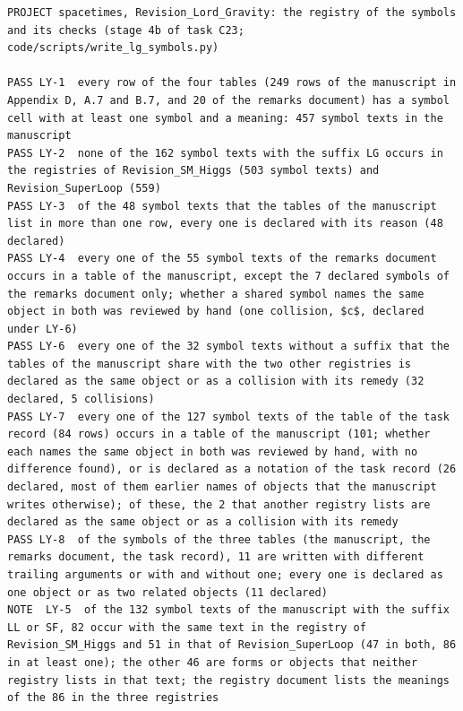 \documentclass[
  10pt,
]{article}
\begin{document}
\begin{verbatim}
PROJECT spacetimes, Revision_Lord_Gravity: the registry of the symbols and its checks (stage 4b of task C23; code/scripts/write_lg_symbols.py)

PASS LY-1  every row of the four tables (249 rows of the manuscript in Appendix D, A.7 and B.7, and 20 of the remarks document) has a symbol cell with at least one symbol and a meaning: 457 symbol texts in the manuscript
PASS LY-2  none of the 162 symbol texts with the suffix LG occurs in the registries of Revision_SM_Higgs (503 symbol texts) and Revision_SuperLoop (559)
PASS LY-3  of the 48 symbol texts that the tables of the manuscript list in more than one row, every one is declared with its reason (48 declared)
PASS LY-4  every one of the 55 symbol texts of the remarks document occurs in a table of the manuscript, except the 7 declared symbols of the remarks document only; whether a shared symbol names the same object in both was reviewed by hand (one collision, $c$, declared under LY-6)
PASS LY-6  every one of the 32 symbol texts without a suffix that the tables of the manuscript share with the two other registries is declared as the same object or as a collision with its remedy (32 declared, 5 collisions)
PASS LY-7  every one of the 127 symbol texts of the table of the task record (84 rows) occurs in a table of the manuscript (101; whether each names the same object in both was reviewed by hand, with no difference found), or is declared as a notation of the task record (26 declared, most of them earlier names of objects that the manuscript writes otherwise); of these, the 2 that another registry lists are declared as the same object or as a collision with its remedy
PASS LY-8  of the symbols of the three tables (the manuscript, the remarks document, the task record), 11 are written with different trailing arguments or with and without one; every one is declared as one object or as two related objects (11 declared)
NOTE  LY-5  of the 132 symbol texts of the manuscript with the suffix LL or SF, 82 occur with the same text in the registry of Revision_SM_Higgs and 51 in that of Revision_SuperLoop (47 in both, 86 in at least one); the other 46 are forms or objects that neither registry lists in that text; the registry document lists the meanings of the 86 in the three registries


\end{verbatim}
\end{document}
